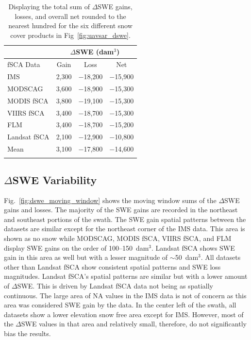 \begin{table}
\centering
\caption{Displaying the total sum of $\Delta$SWE gains, losses, and overall net rounded to the nearest hundred for the six different snow cover products in Fig~\ref{fig:uavsar_dswe}.}
\begin{tabular}{lccc}
\toprule
& \multicolumn{3}{c}{$\Delta$SWE (dam$^{3}$)} \\
\midrule
fSCA Data & Gain & Loss & Net \\
\midrule
IMS & 2,300 & $-$18,200 & $-$15,900 \\
MODSCAG & 3,600 & $-$18,900 & $-$15,300 \\
MODIS fSCA & 3,800 & $-$19,100 & $-$15,300 \\
VIIRS fSCA & 3,400 & $-$18,700 & $-$15,300 \\
FLM & 3,400 & $-$18,700 & $-$15,200 \\
Landsat fSCA & 2,100 & $-$12,900 & $-$10,800 \\
\midrule
Mean & 3,100 & $-$17,800 & $-$14,600 \\
\bottomrule
\label{tab:dswe_stats}
\end{tabular}
\end{table}



\hypertarget{ch4-results}{\subsection{$\Delta$SWE Variability}\label{ch4-results}}

Fig.~\ref{fig:dswe_moving_window} shows the moving window sums of the $\Delta$SWE gains and losses. The majority of the SWE gains are recorded in the northeast and southeast portions of the swath. The SWE gain spatial patterns between the datasets are similar except for the northeast corner of the IMS data. This area is shown as no snow while MODSCAG, MODIS fSCA, VIIRS fSCA, and FLM display SWE gains on the order of 100--150~dam$^{3}$. Landsat fSCA shows SWE gain in this area as well but with a lesser magnitude of $\sim$50~dam$^{3}$. All datasets other than Landsat fSCA show consistent spatial patterns and SWE loss magnitudes. Landsat fSCA's spatial patterns are similar but with a lower amount of $\Delta$SWE. This is driven by Landsat fSCA data not being as spatially continuous. The large area of NA values in the IMS data is not of concern as this area was considered SWE gain by the data. In the center left of the swath, all datasets show a lower elevation snow free area except for IMS. However, most of the $\Delta$SWE values in that area and relatively small, therefore, do not significantly bias the results.

